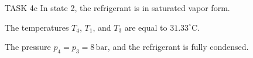 TASK 4c  
In state 2, the refrigerant is in saturated vapor form.  

The temperatures \( T_4 \), \( T_1 \), and \( T_3 \) are equal to \( 31.33^\circ\text{C} \).  

The pressure \( p_4 = p_3 = 8 \, \text{bar} \), and the refrigerant is fully condensed.